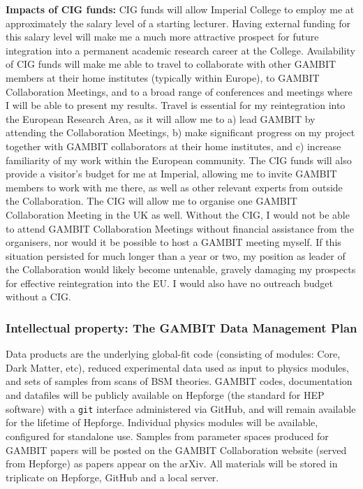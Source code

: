 \documentclass[a4paper,11pt]{article}
\begin{document}
\vspace{3mm}
\noindent \textbf{Impacts of CIG funds:} CIG funds will allow Imperial College to employ me at approximately the salary level of a starting lecturer. Having external funding for this salary level will make me a much more attractive prospect for future integration into a permanent academic research career at the College.  Availability of CIG funds will make me able to travel to collaborate with other GAMBIT members at their home institutes (typically within Europe), to GAMBIT Collaboration Meetings, and to a broad range of conferences and meetings where I will be able to present my results.  Travel is essential for my reintegration into the European Research Area, as it will allow me to a) lead GAMBIT by attending the Collaboration Meetings, b) make significant progress on my project together with GAMBIT collaborators at their home institutes, and c) increase familiarity of my work within the European community.  The CIG funds will also provide a visitor's budget for me at Imperial, allowing me to invite GAMBIT members to work with me there, as well as other relevant experts from outside the Collaboration.  The CIG will allow me to organise one GAMBIT Collaboration Meeting in the UK as well.  Without the CIG, I would not be able to attend GAMBIT Collaboration Meetings without financial assistance from the organisers, nor would it be possible to host a GAMBIT meeting myself. If this situation persisted for much longer than a year or two, my position as leader of the Collaboration would likely become untenable, gravely damaging my prospects for effective reintegration into the EU.  I would also have no outreach budget without a CIG.

\subsubsection{Intellectual property: The GAMBIT Data Management Plan}

Data products are the underlying global-fit code (consisting of modules: Core, Dark Matter, etc), reduced experimental data used as input to physics modules, and sets of samples from scans of BSM theories.  GAMBIT codes, documentation and datafiles will be publicly available on Hepforge (the standard for HEP software) with a \texttt{git} interface administered via GitHub, and will remain available for the lifetime of Hepforge.  Individual physics modules will be available, configured for standalone use.  Samples from parameter spaces produced for GAMBIT papers will be posted on the GAMBIT Collaboration website (served from Hepforge) as papers appear on the arXiv.  All materials will be stored in triplicate on Hepforge, GitHub and a local server.
\end{document}

